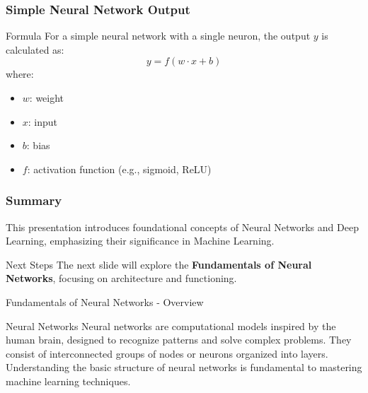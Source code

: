\documentclass[aspectratio=169]{beamer}
\begin{document}
\begin{frame}[fragile]
    \frametitle{Simple Neural Network Output}
    \begin{block}{Formula}
        For a simple neural network with a single neuron, the output \( y \) is calculated as:
        \begin{equation}
            y = f(w \cdot x + b) 
        \end{equation}
        where:
        \begin{itemize}
            \item \( w \): weight
            \item \( x \): input
            \item \( b \): bias
            \item \( f \): activation function (e.g., sigmoid, ReLU)
        \end{itemize}
    \end{block}
\end{frame}

\begin{frame}[fragile]
    \frametitle{Summary}
    This presentation introduces foundational concepts of Neural Networks and Deep Learning, emphasizing their significance in Machine Learning. 
    \begin{block}{Next Steps}
        The next slide will explore the \textbf{Fundamentals of Neural Networks}, focusing on architecture and functioning.
    \end{block}
\end{frame}

\begin{frame}[fragile]{Fundamentals of Neural Networks - Overview}
    \begin{block}{Neural Networks}
        Neural networks are computational models inspired by the human brain, designed to recognize patterns and solve complex problems. They consist of interconnected groups of nodes or neurons organized into layers. Understanding the basic structure of neural networks is fundamental to mastering machine learning techniques.
    \end{block}
\end{frame}
\end{document}
